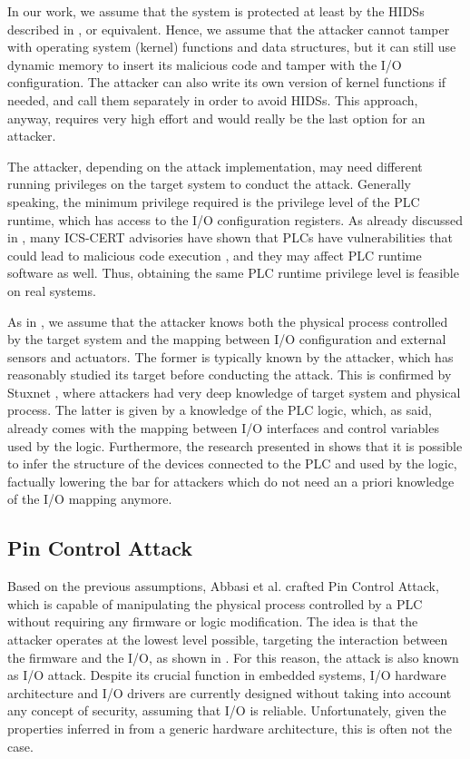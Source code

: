 In our work, we assume that the system is protected at least by the HIDSs described in , or equivalent.
Hence, we assume that the attacker cannot tamper with operating system (kernel) functions and data structures, but it can still use dynamic memory to insert its malicious code
and tamper with the I/O configuration. The attacker can also write its own version of kernel functions if needed, and call them separately in order to avoid HIDSs.
This approach, anyway, requires very high effort and would really be the last option for an attacker.

The attacker, depending on the attack implementation, may need different running privileges on the target system to conduct the attack.
Generally speaking, the minimum privilege required is the privilege level of the PLC runtime, which has access to the I/O configuration registers.
As already discussed in \cite{ghostplc}, many ICS-CERT advisories have shown that PLCs have vulnerabilities that could lead to malicious code execution
\cite{plc-network,abb-codesys,codesys-server,schneider-bof,rockwell-vuln,rockwell-vuln2}, and they may affect PLC runtime software as well.
Thus, obtaining the same PLC runtime privilege level is feasible on real systems.

As in \cite{ghostplc}, we assume that the attacker knows both the physical process controlled by the target system and the mapping
between I/O configuration and external sensors and actuators. The former is typically known by the attacker, which has reasonably studied its target before conducting the attack.
This is confirmed by Stuxnet \cite{stuxnet}, where attackers had very deep knowledge of target system and physical process.
The latter is given by a knowledge of the PLC logic, which, as said, already comes with the mapping between I/O interfaces and control variables used by the logic.
Furthermore, the research presented in \cite{dynamic-payload,sabot} shows that it is possible to infer the structure of the devices connected to the PLC and used by the logic,
factually lowering the bar for attackers which do not need an a priori knowledge of the I/O mapping anymore.


\subsection{Pin Control Attack}

Based on the previous assumptions, Abbasi et al. \cite{ghostplc} crafted Pin Control Attack, which is capable of manipulating the physical process
controlled by a PLC without requiring any firmware or logic modification.
The idea is that the attacker operates at the lowest level possible, targeting the interaction
between the firmware and the I/O, as shown in . For this reason, the attack is also known as I/O attack.
Despite its crucial function in embedded systems, I/O hardware architecture and I/O drivers are currently designed
without taking into account any concept of security, assuming that I/O is reliable. Unfortunately, given the properties inferred in 
from a generic hardware architecture, this is often not the case.

